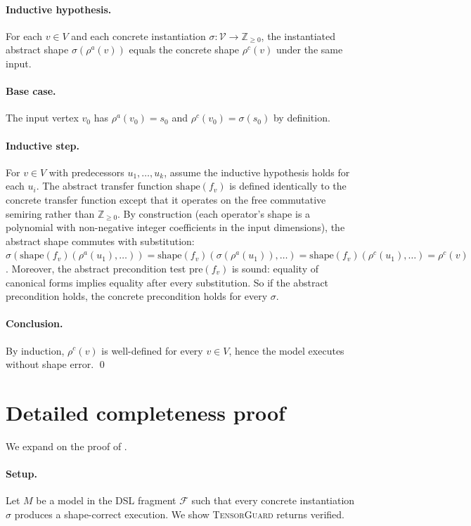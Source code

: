 \documentclass{article}
\theoremstyle{definition}
\begin{document}
\paragraph{Inductive hypothesis.} For each $v\in V$ and each
concrete instantiation $\sigma:\mathcal V\to\mathbb Z_{\ge 0}$,
the instantiated abstract shape $\sigma(\rho^a(v))$ equals the
concrete shape $\rho^c(v)$ under the same input.

\paragraph{Base case.} The input vertex $v_0$ has
$\rho^a(v_0)=s_0$ and $\rho^c(v_0)=\sigma(s_0)$ by definition.

\paragraph{Inductive step.} For $v\in V$ with predecessors
$u_1,\ldots,u_k$, assume the inductive hypothesis holds for each
$u_i$. The abstract transfer function $\mathrm{shape}(f_v)$ is
defined identically to the concrete transfer function except that
it operates on the free commutative semiring rather than
$\mathbb Z_{\ge 0}$. By construction (each operator's shape is a
polynomial with non-negative integer coefficients in the input
dimensions), the abstract shape commutes with substitution:
$\sigma(\mathrm{shape}(f_v)(\rho^a(u_1),\ldots))
=\mathrm{shape}(f_v)(\sigma(\rho^a(u_1)),\ldots)
=\mathrm{shape}(f_v)(\rho^c(u_1),\ldots)
=\rho^c(v)$.
Moreover, the abstract precondition test $\mathrm{pre}(f_v)$ is
sound: equality of canonical forms implies equality after every
substitution. So if the abstract precondition holds, the concrete
precondition holds for every $\sigma$.

\paragraph{Conclusion.} By induction, $\rho^c(v)$ is well-defined
for every $v\in V$, hence the model executes without shape error.
\qed

\section{Detailed completeness proof}\label{sec:completeness-proof}
We expand on the proof of .

\paragraph{Setup.} Let $M$ be a model in the DSL fragment
$\mathcal F$ such that every concrete instantiation
$\sigma$ produces a shape-correct execution. We show
\textsc{TensorGuard} returns \textsf{verified}.
\end{document}
